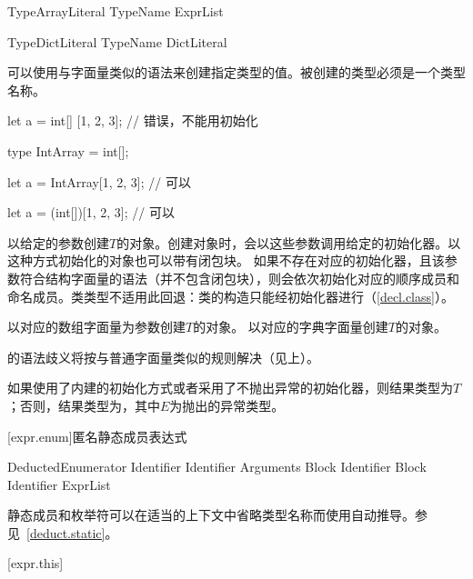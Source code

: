 \begin{bnf}{TypeArrayLiteral}
    TypeName \terminal{[} ExprList\bnfq \terminal{]}
\end{bnf}

\begin{bnf}{TypeDictLiteral}
    TypeName DictLiteral
\end{bnf}

\pnum
可以使用与字面量类似的语法来创建指定类型的值。被创建的类型必须是一个类型名称。

\enterexample
\begin{codeblock}

let a = int[] [1, 2, 3]; // 错误，不能用\tcode{[]}初始化

type IntArray = int[];

let a = IntArray[1, 2, 3]; // 可以

let a = (int[])[1, 2, 3]; // 可以

\end{codeblock}
\exitexample

\pnum
{}以给定的参数创建$T$的对象。创建对象时，会以这些参数调用给定的初始化器。以这种方式初始化的对象也可以带有闭包块。
如果不存在对应的初始化器，且该参数符合结构字面量的语法（并不包含闭包块），则会依次初始化对应的顺序成员和命名成员。类类型不适用此回退：类的构造只能经初始化器进行（\ref{decl.class}）。

\pnum
{}以对应的数组字面量为参数创建$T$的对象。
以对应的字典字面量创建$T$的对象。

\pnum
{}的语法歧义将按与普通字面量类似的规则解决（见上）。

\pnum
如果使用了内建的初始化方式或者采用了不抛出异常的初始化器，则结果类型为$T$；否则，结果类型为，其中$E$为抛出的异常类型。

[expr.enum]{匿名静态成员表达式}

\begin{bnf}{DeductedEnumerator}
     Identifier \br
     Identifier \terminal{(} Arguments\bnfq \terminal{)} Block\bnfs \br
     Identifier Block \br
     Identifier \terminal{[} ExprList\bnfq \terminal{]}
\end{bnf}

\pnum
静态成员和枚举符可以在适当的上下文中省略类型名称而使用自动推导。参见~\ref{deduct.static}。

[expr.this]{}

